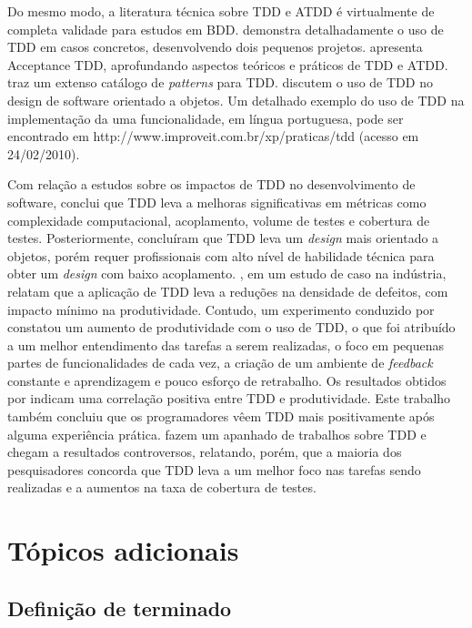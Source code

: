 \documentclass[a4paper,abntfigtabnum,noindentfirst]{abnt}
\begin{document}
Do mesmo modo, a literatura técnica sobre TDD e ATDD é virtualmente de completa validade para estudos em BDD.   demonstra detalhadamente o uso de TDD em casos concretos, desenvolvendo dois pequenos projetos.  apresenta Acceptance TDD, aprofundando aspectos teóricos e práticos de TDD e ATDD.  traz um extenso catálogo de \textit{patterns} para TDD.  discutem o uso de TDD no design de software orientado a objetos. Um detalhado exemplo do uso de TDD na implementação da uma funcionalidade, em língua portuguesa, pode ser encontrado em http://www.improveit.com.br/xp/praticas/tdd (acesso em 24/02/2010).

Com relação a estudos sobre os impactos de TDD no desenvolvimento de software,  conclui que TDD leva a melhoras significativas em métricas como complexidade computacional, acoplamento, volume de testes e cobertura de testes. Posteriormente,  concluíram que TDD leva um \textit{design} mais orientado a objetos, porém requer profissionais com alto nível de habilidade técnica para obter um \textit{design} com baixo acoplamento. , em um estudo de caso na indústria, relatam que a aplicação de TDD leva a reduções na densidade de defeitos, com impacto mínimo na produtividade. Contudo, um experimento conduzido por  constatou um aumento de produtividade com o uso de TDD, o que foi atribuído a um melhor entendimento das tarefas a serem realizadas, o foco em pequenas partes de funcionalidades de cada vez, a criação de um ambiente de \textit{feedback} constante e aprendizagem e pouco esforço de retrabalho. Os resultados obtidos por  indicam uma correlação positiva entre TDD e produtividade. Este trabalho também concluiu que os programadores vêem TDD mais positivamente após alguma experiência prática.  fazem um apanhado de trabalhos sobre TDD e chegam a resultados controversos, relatando, porém, que a maioria dos pesquisadores concorda que TDD leva a um melhor foco nas tarefas sendo realizadas e a aumentos na taxa de cobertura de testes.

\section{Tópicos adicionais}

\subsection{Definição de terminado}
\end{document}
